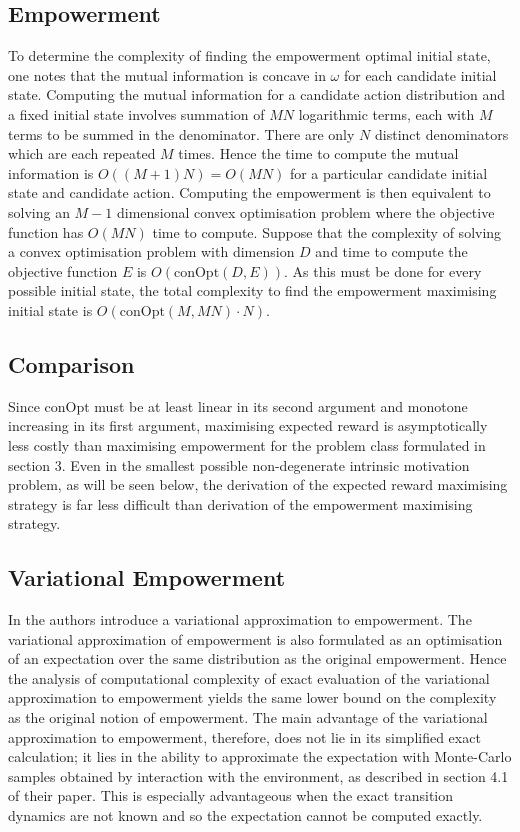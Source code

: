 \documentclass{article}
\begin{document}
\subsection{Empowerment}
To determine the complexity of finding the empowerment optimal initial state, one notes that the mutual information is concave \cite{braverman2011information} in $\omega$ for each candidate initial state. Computing the mutual information for a candidate action distribution and a fixed initial state involves summation of $MN$ logarithmic terms, each with $M$ terms to be summed in the denominator. There are only $N$ distinct denominators which are each repeated $M$ times. Hence the time to compute the mutual information is $O((M+1)N)=O(MN)$ for a particular candidate initial state and candidate action. Computing the empowerment is then equivalent to solving an $M-1$ dimensional convex optimisation problem where the objective function has $O(MN)$ time to compute.  Suppose that the complexity of solving a convex optimisation problem with dimension $D$ and time to compute the objective function $E$ is $O(\text{conOpt}(D,E))$. As this must be done for every possible initial state, the total complexity to find the empowerment maximising initial state is $O(\text{conOpt}(M,MN)\cdot N)$. 

\subsection{Comparison}
Since $\text{conOpt}$ must be at least linear in its second argument and monotone increasing in its first argument, maximising expected reward is asymptotically less costly than maximising empowerment for the problem class formulated in section 3.
Even in the smallest possible non-degenerate intrinsic motivation problem, as will be seen below, the derivation of the expected reward maximising strategy is far less difficult than derivation of the empowerment maximising strategy. 

\subsection{Variational Empowerment}
In \cite{mohamed2015variational} the authors introduce a variational approximation to empowerment. The variational approximation of empowerment is also formulated as an optimisation of an expectation over the same distribution as the original empowerment. Hence the analysis of computational complexity of exact evaluation of the variational approximation to empowerment yields the same lower bound on the complexity as the original notion of empowerment. The main advantage of the variational approximation to empowerment, therefore, does not lie in its simplified exact calculation; it lies in the ability to approximate the expectation with Monte-Carlo samples obtained by interaction with the environment, as described in section 4.1 of their paper. This is especially advantageous when the exact transition dynamics are not known and so the expectation cannot be computed exactly. 
\end{document}
